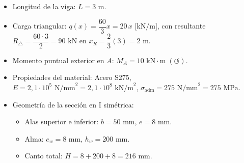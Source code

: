 \begin{tcolorbox}[colback=blue!5!white,colframe=blue!75!black,title=\textbf{Datos del Problema}]
    \begin{itemize}
        \item Longitud de la viga: $L = 3\text{ m}$.
        \item Carga triangular: $q(x) = \dfrac{60}{3}x = 20\,x\text{ [kN/m]}$, con resultante $R_{\triangle} = \dfrac{60 \cdot 3}{2} = 90\text{ kN}$ en $x_R = \dfrac{2}{3}(3) = 2\text{ m}$.
        \item Momento puntual exterior en $A$: $M_A = 10\text{ kN}\cdot\text{m}\;(\circlearrowleft)$.
        \item Propiedades del material: Acero S275, $E = 2{,}1 \cdot 10^5\text{ N/mm}^2 = 2{,}1 \cdot 10^8\text{ kN/m}^2$, $\sigma_{\text{adm}} = 275\text{ N/mm}^2 = 275\text{ MPa}$.
        \item Geometría de la sección en I simétrica:
              \begin{itemize}
                  \item Alas superior e inferior: $b = 50\text{ mm}$, $e = 8\text{ mm}$.
                  \item Alma: $e_w = 8\text{ mm}$, $h_w = 200\text{ mm}$.
                  \item Canto total: $H = 8 + 200 + 8 = 216\text{ mm}$.
              \end{itemize}
    \end{itemize}
\end{tcolorbox}

